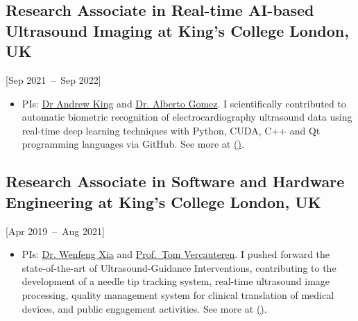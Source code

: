 \documentclass{mycv}
\begin{document}
\subsection{Research Associate in Real-time AI-based Ultrasound Imaging at King's College London, UK}[Sep 2021~--~Sep 2022]
\begin{itemize}
  \item PIs: \href{http://kclmmag.org/}{Dr Andrew King} and  \href{https://gomezalberto.github.io/}{Dr. Alberto Gomez}.
I scientifically contributed to automatic biometric recognition of electrocardiography ultrasound data using real-time deep learning techniques with Python, CUDA, C++ and Qt programming languages via GitHub.
See more at \href{http://vital.oucru.org/major-partners/kings-college-london/}{(\faExternalLink*)}.
\end{itemize}

\subsection{Research Associate in Software and Hardware Engineering at King's College London, UK}[Apr 2019~--~Aug 2021]
\begin{itemize}
  \item PIs: \href{https://www.purlkcl.org/}{Dr. Wenfeng Xia} and \href{https://cai4cai.ml}{Prof.~Tom Vercauteren}.
  I pushed forward the state-of-the-art of Ultrasound-Guidance Interventions,
	contributing to the development of a needle tip tracking system, real-time ultrasound image processing,
	quality management system for clinical translation of medical devices, and public engagement activities.
	See more at \href{https://cai4cai.ml/author/miguel-xochicale/}{(\faExternalLink*)}.
\end{itemize}
\end{document}
